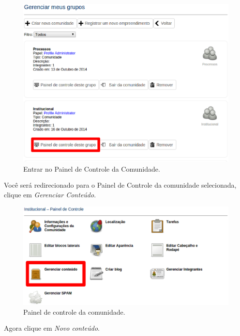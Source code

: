 \begin{figure}[H]
  \centering
    \includegraphics[keepaspectratio=true,scale=0.49]{figuras/selecionandoComunidade.eps}
  \caption{Entrar no Painel de Controle da Comunidade.}
  \label{fig:selecionandoComunidade}
\end{figure}

\newpage
Você será redirecionado para o Painel de Controle da comunidade selecionada, clique em \emph{\color{red}Gerenciar Conteúdo}.

\begin{figure}[H]
  \centering
    \includegraphics[keepaspectratio=true,scale=0.49]{figuras/painelControleGerenciarConteudo.eps}
  \caption{Painel de controle da comunidade.}
  \label{fig:GerContPainelControle}
\end{figure}

Agora clique em \emph{\color{red}Novo conteúdo}.

